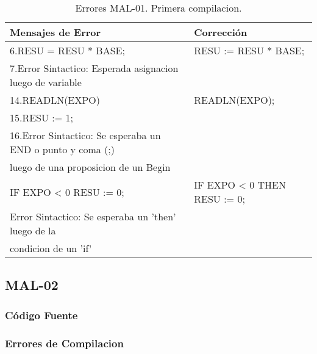 \documentclass[a4paper,12pt]{article}
\begin{document}
\begin{table}[h!]
\centering
\begin{tabular}{|l|l|}
\hline
Mensajes de Error & Corrección\\
\hline
6.RESU = RESU * BASE;										& RESU := RESU * BASE;\\
7.Error Sintactico: Esperada asignacion luego de variable		&\\
\hline
14.READLN(EXPO)												& READLN(EXPO);\\
15.RESU := 1;												&\\
16.Error Sintactico: Se esperaba un END o punto y coma (;) 	&\\
luego de una proposicion de un Begin							& \\
\hline
IF EXPO < 0  RESU := 0;										& IF EXPO < 0 THEN RESU := 0;\\
Error Sintactico: Se esperaba un 'then' luego de la 			&\\
condicion de un 'if'											& \\
\hline
\end{tabular}
\caption{Errores MAL-01. Primera compilacion.}
\label{MAL-01-1}
\end{table}

\subsection{MAL-02}
\subsubsection{Código Fuente}

\subsubsection{Errores de Compilacion}
\end{document}
